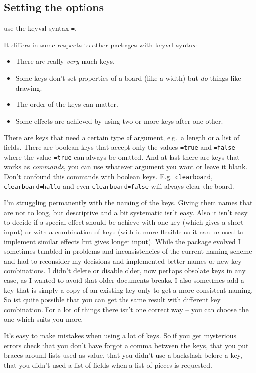 \documentclass[pagesize,parskip=half-,fontsize=12pt]{scrartcl}
\begin{document}
\subsection{Setting the options}

\Pchessboard use the keyval syntax \texttt{=}.

It differs in some respects to other packages with keyval syntax:
\mynobreakpar
\begin{itemize}
\item
There are really \emph{very} much keys.
\item
Some keys don't set properties of a board (like a width) but
\emph{do} things like drawing.
\item
The order of the keys can matter.
\item
Some effects are achieved by using two or more keys after one other.
\end{itemize}

There are keys that need a certain type of argument, e.g.\ a length
or a list of fields.  There are boolean keys that accept only the
values \texttt{=true} and \texttt{=false} where the value
\texttt{=true} can always be omitted. And at last there are keys
that works as \emph{commands}, you can use whatever argument you want
or leave it blank. Don't confound this commands with boolean keys.
E.g.\
\texttt{clearboard}, \texttt{clearboard=hallo} and even
\texttt{clearboard=false} will always clear the board.


I'm struggling permanently with the naming of the keys. Giving them
names that are not to long, but descriptive and a bit systematic
isn't easy. Also it isn't easy to decide if a special effect should
be achieve with one key (which gives a short input) or with a
combination of keys (with is more flexible as it can be used to
implement similar effects but gives longer input). While the package
evolved I sometimes tumbled in problems and inconsistencies of the
current naming scheme and had to reconsider my decisions and
implemented better names or new key combinations. I didn't delete or
disable older, now perhaps obsolate keys in any case, as I wanted to
avoid that older documents breaks.  I also sometimes add a key that
is simply a copy of an existing key only to get a more consistent
naming. So ist quite possible that you can get the same result with
different key combination. For a lot of things there isn't one
correct way -- you can choose the one which suits you more.


It's easy to make mistakes when using a lot of keys. So if you get
mysterious errors check that you don't have forgot a comma between
the keys, that you put braces around lists used as value, that you
didn't use a backslash before a key, that you didn't used a list of
fields when a list of pieces is requested.
\end{document}
